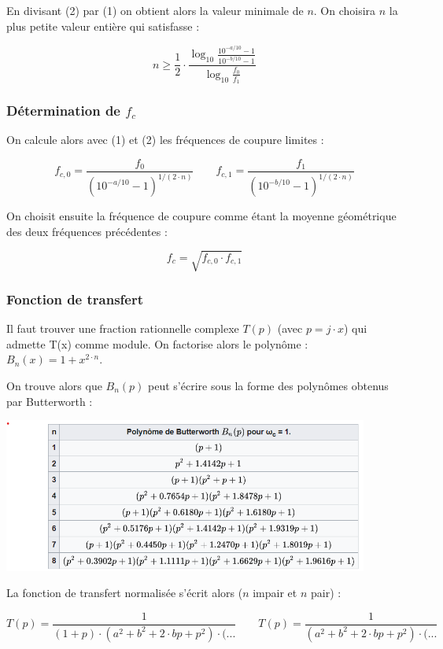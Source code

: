 \documentclass[a4paper,french]{paper}
\begin{document}
\medskip

En divisant (2) par (1) on obtient alors la valeur minimale de $n$. On choisira $n$ la plus petite valeur entière qui satisfasse :

$$ n \ge \frac{1}{2} \cdot \frac{\log_{10} \frac{10^{-a/10} - 1}{10^{-b/10} - 1}}{\log_{10} \frac{f_0}{f_1}}$$


\subsubsection*{Détermination de $f_c$}

On calcule alors avec (1) et (2) les fréquences de coupure limites :

$$f_{c,0} = \frac{f_0}{(10^{-a/10} - 1)^{1/(2\cdot n)}} \qquad f_{c,1} = \frac{f_1}{(10^{-b/10} - 1)^{1/(2\cdot n)}}$$

On choisit ensuite la fréquence de coupure comme étant la moyenne géométrique des deux fréquences précédentes :

$$f_c = \sqrt{f_{c,0} \cdot f_{c,1}} $$


\subsubsection*{Fonction de transfert}

Il faut trouver une fraction rationnelle complexe $T(p)$ (avec $p=j\cdot x$) qui admette T(x) comme module. On factorise alors le polynôme : $B_n(x) = 1 + x^{2\cdot n}$. 

On trouve alors que $B_n(p)$ peut s'écrire sous la forme des polynômes obtenus par Butterworth :

\begin{center}
	\includegraphics[width=12cm]{images/polynomes_butter.png}
\end{center}


La fonction de transfert normalisée s'écrit alors ($n$ impair et $n$ pair) :

$$ T(p) = \frac{1}{(1 + p) \cdot (a^2 + b^2 + 2\cdot b p + p^2) \cdot (...} \qquad  T(p) = \frac{1}{(a^2 + b^2 + 2\cdot b p + p^2) \cdot (...} $$
\end{document}
